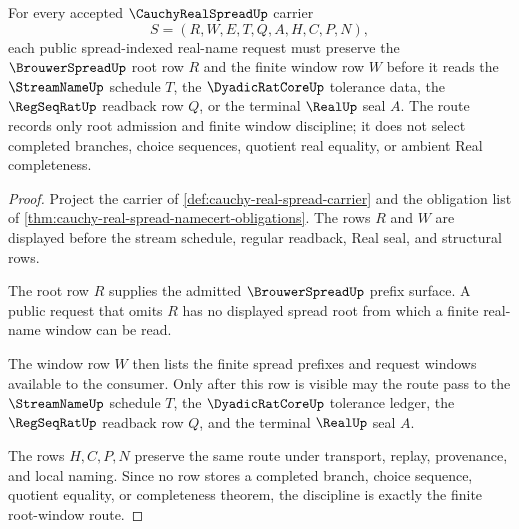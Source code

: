 \begin{theorem}
\label{thm:cauchy-real-spread-root-window-discipline}
For every accepted $\CauchyRealSpreadUp$ carrier
$$
S=(R,W,E,T,Q,A,H,C,P,N),
$$
each public spread-indexed real-name request must preserve the $\BrouwerSpreadUp$ root row $R$ and the finite window row $W$ before it reads the $\StreamNameUp$ schedule $T$, the $\DyadicRatCoreUp$ tolerance data, the $\RegSeqRatUp$ readback row $Q$, or the terminal $\RealUp$ seal $A$. The route records only root admission and finite window discipline; it does not select completed branches, choice sequences, quotient real equality, or ambient Real completeness.
\end{theorem}
\begin{proof}
Project the carrier of \autoref{def:cauchy-real-spread-carrier} and the obligation list of \autoref{thm:cauchy-real-spread-namecert-obligations}. The rows $R$ and $W$ are displayed before the stream schedule, regular readback, Real seal, and structural rows.

The root row $R$ supplies the admitted $\BrouwerSpreadUp$ prefix surface. A public request that omits $R$ has no displayed spread root from which a finite real-name window can be read.

The window row $W$ then lists the finite spread prefixes and request windows available to the consumer. Only after this row is visible may the route pass to the $\StreamNameUp$ schedule $T$, the $\DyadicRatCoreUp$ tolerance ledger, the $\RegSeqRatUp$ readback row $Q$, and the terminal $\RealUp$ seal $A$.

The rows $H,C,P,N$ preserve the same route under transport, replay, provenance, and local naming. Since no row stores a completed branch, choice sequence, quotient equality, or completeness theorem, the discipline is exactly the finite root-window route.
\end{proof}

